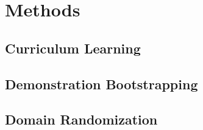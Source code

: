 \chapter{Methods}


\section{Curriculum Learning}


\section{Demonstration Bootstrapping}


\section{Domain Randomization}

